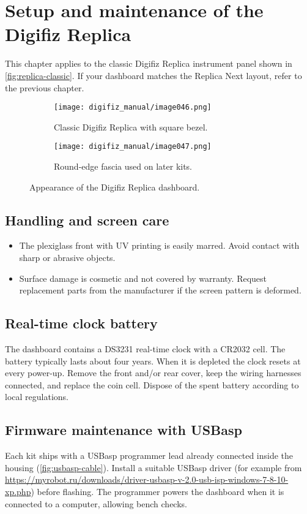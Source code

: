 \chapter{Setup and maintenance of the Digifiz Replica}\label{ch:replica-setup}

This chapter applies to the classic Digifiz Replica instrument panel shown in \autoref{fig:replica-classic}. If your dashboard matches the Replica Next layout, refer to the previous chapter.

\begin{figure}[htbp]
    \centering
    \begin{subfigure}{0.46\textwidth}
        \texttt{[image: digifiz\_manual/image046.png]}
        \caption{Classic Digifiz Replica with square bezel.}
    \end{subfigure}\hfill
    \begin{subfigure}{0.46\textwidth}
        \texttt{[image: digifiz\_manual/image047.png]}
        \caption{Round-edge fascia used on later kits.}
    \end{subfigure}
    \caption{Appearance of the Digifiz Replica dashboard.}
    \label{fig:replica-classic}
\end{figure}

\section{Handling and screen care}
\begin{itemize}
    \item The plexiglass front with UV printing is easily marred. Avoid contact with sharp or abrasive objects.
    \item Surface damage is cosmetic and not covered by warranty. Request replacement parts from the manufacturer if the screen pattern is deformed.
\end{itemize}

\section{Real-time clock battery}
The dashboard contains a DS3231 real-time clock with a CR2032 cell. The battery typically lasts about four years. When it is depleted the clock resets at every power-up. Remove the front and/or rear cover, keep the wiring harnesses connected, and replace the coin cell. Dispose of the spent battery according to local regulations.

\section{Firmware maintenance with USBasp}
Each kit ships with a USBasp programmer lead already connected inside the housing (\autoref{fig:usbasp-cable}). Install a suitable USBasp driver (for example from \url{https://myrobot.ru/downloads/driver-usbasp-v-2.0-usb-isp-windows-7-8-10-xp.php}) before flashing. The programmer powers the dashboard when it is connected to a computer, allowing bench checks.

